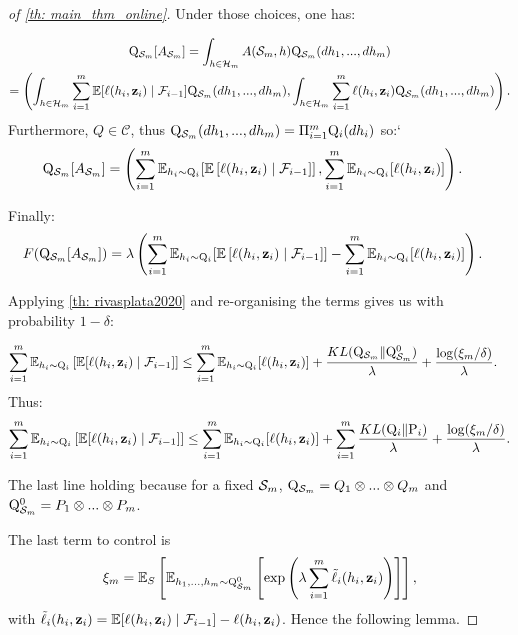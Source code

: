 \begin{noaddcontents}
\begin{proof}[of \cref{th: main_thm_online}]
\noindent Under those choices, one has:

\begin{multline*}
  \mathrm{Q}_{\mathcal{S}_m}[A_{\mathcal{S}_m}]  = \int_{h\in\mathcal{H}_m} A(\mathcal{S}_m,h) \mathrm{Q}_{\mathcal{S}_m}(dh_1,...,dh_m) \\
     = \left( \int_{h\in\mathcal{H}_m} \sum_{i=1}^m \mathbb{E}[\ell(h_i,\mathbf{z}_i)\mid \mathcal{F}_{i-1}]\mathrm{Q}_{\mathcal{S}_m}(dh_1,...,dh_m), \int_{h\in\mathcal{H}_m}\sum_{i=1}^m \ell(h_i,\mathbf{z}_i)  \mathrm{Q}_{\mathcal{S}_m}(dh_1,...,dh_m)    \right).
\end{multline*}
Furthermore, $Q\in\mathcal{C}$, thus $\mathrm{Q}_{\mathcal{S}_m}(dh_1,...,dh_m)= \Pi_{i=1}^m \mathrm{Q}_{i}(dh_i)$ so:`
\begin{align*}
  \mathrm{Q}_{\mathcal{S}_m}[A_{\mathcal{S}_m}] &= \left(  \sum_{i=1}^m \mathbb{E}_{h_i\sim \mathrm{Q}_{i}}[\mathbb{E}\left[\ell(h_i,\mathbf{z}_i)\mid \mathcal{F}_{i-1}]\right], \sum_{i=1}^m \mathbb{E}_{h_i\sim \mathrm{Q}_{i}}[\ell(h_i,\mathbf{z}_i)]       \right).
\end{align*}

Finally:
\begin{align*}
      F(\mathrm{Q}_{\mathcal{S}_m}[A_{\mathcal{S}_m}])&= \lambda \left(\sum_{i=1}^m \mathbb{E}_{h_i\sim \mathrm{Q}_{i}}[\mathbb{E}\left[\ell(h_i,\mathbf{z}_i)\mid \mathcal{F}_{i-1}]\right]- \sum_{i=1}^m \mathbb{E}_{h_i\sim \mathrm{Q}_{i}}[\ell(h_i,\mathbf{z}_i)] \right).
\end{align*}


Applying \cref{th: rivasplata2020} and re-organising the terms gives us with probability $1-\delta$:

\begin{align*}
\sum_{i=1}^m \mathbb{E}_{h_i\sim \mathrm{Q}_{i}}\left[\mathbb{E}[\ell(h_i,\mathbf{z}_i)\mid \mathcal{F}_{i-1}]\right] & \leq \sum_{i=1}^m \mathbb{E}_{h_i\sim \mathrm{Q}_{i}}[\ell(h_i,\mathbf{z}_i)] + \frac{KL(\mathrm{Q}_{\mathcal{S}_m}\|\mathrm{Q}_{\mathcal{S}_m}^0)}{\lambda} + \frac{\log(\xi_m/\delta)}{\lambda}.
\end{align*}
\noindent Thus:
\begin{align}
  \label{eq: temp_result_online_thm}
 \sum_{i=1}^m \mathbb{E}_{h_i\sim \mathrm{Q}_{i}}\left[\mathbb{E}[\ell(h_i,\mathbf{z}_i)\mid \mathcal{F}_{i-1}]\right] \leq \sum_{i=1}^m \mathbb{E}_{h_i\sim \mathrm{Q}_{i}}[\ell(h_i,\mathbf{z}_i)] + \sum_{i=1}^m \frac{KL(\mathrm{Q}_{i}\|\mathrm{P}_{i})}{\lambda} + \frac{\log(\xi_m/\delta)}{\lambda}.
\end{align}

\noindent The last line holding because for a fixed $\mathcal{S}_m$, $\mathrm{Q}_{\mathcal{S}_m}= Q_1\otimes...\otimes Q_m$ and $\mathrm{Q}_{\mathcal{S}_m}^0= P_1\otimes...\otimes P_m$.

\noindent The last term to control is
\begin{align*}
\xi_m = \mathbb{E}_S\left[\mathbb{E}_{h_1,...,h_m \sim \mathrm{Q}_{\mathcal{S}_m}^0} \left[\exp\left(\lambda \sum_{i=1}^m \Tilde{\ell}_i(h_i,\mathbf{z}_i)\right)\right]\right],
\end{align*}
with $\Tilde{\ell}_i(h_i,\mathbf{z}_i)= \mathbb{E}[\ell(h_i,\mathbf{z}_i)\mid \mathcal{F}_{i-1}]-  \ell(h_i,\mathbf{z}_i)$. Hence the following lemma.


\end{proof}
\end{noaddcontents}
